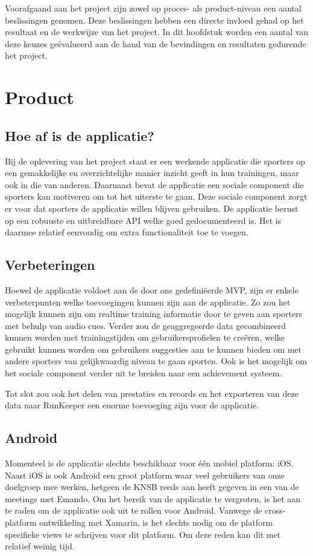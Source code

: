 Voorafgaand aan het project zijn zowel op proces- als product-niveau een aantal beslissingen genomen. Deze beslissingen hebben een directe invloed gehad op het resultaat en de werkwijze van het project. In dit hoofdstuk worden een aantal van deze keuzes geëvalueerd aan de hand van de bevindingen en resultaten gedurende het project. 

\section{Product}

\subsection{Hoe af is de applicatie?}
Bij de oplevering van het project staat er een werkende applicatie die sporters op een gemakkelijke en overzichtelijke manier inzicht geeft in hun trainingen, maar ook in die van anderen. Daarnaast bevat de applicatie een sociale component die sporters kan motiveren om tot het uiterste te gaan. Deze sociale component zorgt er voor dat sporters de applicatie willen blijven gebruiken. De applicatie berust op een robuuste en uitbreidbare API welke goed gedocumenteerd is. Het is daarmee relatief eenvoudig om extra functionaliteit toe te voegen.

\subsection{Verbeteringen}
Hoewel de applicatie voldoet aan de door ons gedefiniëerde MVP, zijn er enkele verbeterpunten welke toevoegingen kunnen zijn aan de applicatie. Zo zou het mogelijk kunnen zijn om realtime training informatie door te geven aan sporters met behulp van audio cues. 
Verder zou de geaggregeerde data gecombineerd kunnen worden met trainingstijden om gebruikersprofielen te creëren, welke gebruikt kunnen worden om gebruikers suggesties aan te kunnen bieden om met andere sporters van gelijkwaardig niveau te gaan sporten.
Ook is het mogelijk om het sociale component verder uit te breiden naar een achievement systeem. 

Tot slot zou ook het delen van prestaties en records en het exporteren van deze data naar RunKeeper een enorme toevoeging zijn voor de applicatie.

\subsection{Android}
Momenteel is de applicatie slechts beschikbaar voor één mobiel platform: iOS. Naast iOS is ook Android een groot platform waar veel gebruikers van onze doelgroep mee werken, hetgeen de \ac{KNSB} reeds aan heeft gegeven in een van de meetings met Emando. Om het bereik van de applicatie te vergroten, is het aan te raden om de applicatie ook uit te rollen voor Android. Vanwege de cross-platform ontwikkeling met Xamarin, is het slechts nodig om de platform specifieke views te schrijven voor dit platform. Om deze reden kan dit met relatief weinig tijd.

